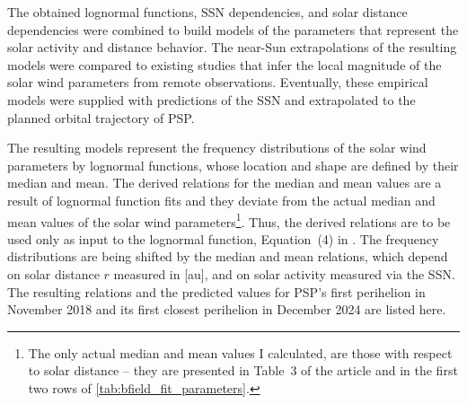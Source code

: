 The obtained lognormal functions, SSN dependencies, and solar distance dependencies were combined to build models of the parameters that represent the solar activity and distance behavior. The near-Sun extrapolations of the resulting models were compared to existing studies that infer the local magnitude of the solar wind parameters from remote observations. Eventually, these empirical models were supplied with predictions of the SSN and extrapolated to the planned orbital trajectory of PSP.

\medskip

The resulting models represent the frequency distributions of the solar wind parameters by lognormal functions, whose location and shape are defined by their median and mean.
The derived relations for the median and mean values are a result of lognormal function fits and they deviate from the actual median and mean values of the solar wind parameters\footnote{The only actual median and mean values I calculated, are those with respect to solar distance -- they are presented in Table~3 of the article and in the first two rows of \autoref{tab:bfield_fit_parameters}.}. Thus, the derived relations are to be used only as input to the lognormal function, Equation~(4) in \citet{Venzmer2018}.
The frequency distributions are being shifted by the median and mean relations, which depend on solar distance $r$ measured in [au], and on solar activity measured via the SSN. The resulting relations and the predicted values for PSP's first perihelion in November 2018 and its first closest perihelion in December 2024 are listed here.
